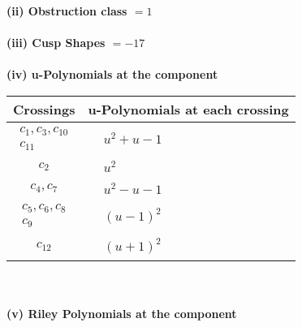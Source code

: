 \documentclass[1p]{elsarticle_modified}
\theoremstyle{definition}
\begin{document}
\flushleft \textbf{(ii) Obstruction class $= 1$}\\~\\
\flushleft \textbf{(iii) Cusp Shapes $= -17$}\\~\\
\newpage\renewcommand{\arraystretch}{1}
\flushleft \textbf{(iv) u-Polynomials at the component}\newline \\
\begin{tabular}{m{50pt}|m{274pt}}
Crossings & \hspace{64pt}u-Polynomials at each crossing \\
\hline $$\begin{aligned}c_{1},c_{3},c_{10}\\c_{11}\end{aligned}$$&$\begin{aligned}
&u^2+u-1
\end{aligned}$\\
\hline $$\begin{aligned}c_{2}\end{aligned}$$&$\begin{aligned}
&u^2
\end{aligned}$\\
\hline $$\begin{aligned}c_{4},c_{7}\end{aligned}$$&$\begin{aligned}
&u^2- u-1
\end{aligned}$\\
\hline $$\begin{aligned}c_{5},c_{6},c_{8}\\c_{9}\end{aligned}$$&$\begin{aligned}
&(u-1)^2
\end{aligned}$\\
\hline $$\begin{aligned}c_{12}\end{aligned}$$&$\begin{aligned}
&(u+1)^2
\end{aligned}$\\
\hline
\end{tabular}\\~\\
\newpage\renewcommand{\arraystretch}{1}
\flushleft \textbf{(v) Riley Polynomials at the component}\newline \\
\end{document}
